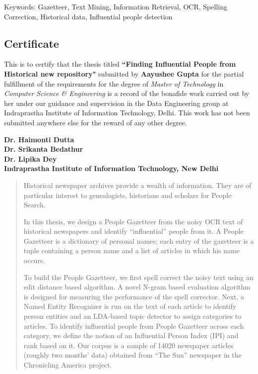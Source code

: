 \documentclass[letterpaper,11pt]{report}
\begin{document}


\newpage

\pagestyle{empty}
\vspace*{7.1in} 
Keywords: Gazetteer, Text Mining, Information Retrieval, OCR, Spelling Correction, Historical data, Influential people detection

\newpage

\begin{center}
\section*{Certificate}\label{section:certificate}
\end{center}
This is to certify that the thesis titled \textbf{``Finding Influential People from Historical new repository"} submitted by \textbf{Aayushee Gupta} for the partial fulfillment of the requirements for the degree of \emph{Master of Technology} in \emph{Computer Science \& Engineering} is a record of the bonafide work carried out by her under our guidance and supervision in the Data Engineering group at Indraprastha Institute of Information Technology, Delhi. This work has not been submitted anywhere else for the reward of any other degree. \\ \vspace{0.5in}

\textbf{Dr. Haimonti Dutta}\\
\textbf{Dr. Srikanta Bedathur}\\
\textbf{Dr. Lipika Dey}\\
\textbf{Indraprastha Institute of Information Technology, New Delhi}

\begin{abstract}

 Historical newspaper archives provide a wealth of information. They
are of particular interest to genealogists, historians and scholars
for People Search.

 In this thesis, we design a People Gazetteer from
the noisy OCR text of historical newspapers and identify “influential”
people from it. A People Gazetteer is a dictionary of personal names;
each entry of the gazetteer is  a tuple containing a person name and a
list of articles in which his name occurs.

To build the People Gazetteer, we first spell correct the noisy text
using an edit distance based algorithm. A novel N-gram based
evaluation algorithm is designed for measuring the performance of the
spell corrector. Next, a Named Entity Recognizer is run on the text of
each article to identify person entities and an LDA-based topic
detector to assign categories to articles. To identify influential
people from People Gazetteer across each category, we define the notion
of an Influential Person Index (IPI) and rank based on it. Our corpus
is a sample of 14020 newspaper articles (roughly two months’ data)
obtained from “The Sun” newspaper in the Chronicling America project.

\end{abstract}
\end{document}
